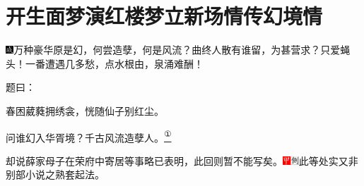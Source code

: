 

\chapter{开生面梦演红楼梦\hspace{.5em}立新场情传幻境情}
{\includegraphics[width=3mm]{../Images/00005}\kaishu 万种豪华原是幻，何尝造孽，何是风流？曲终人散有谁留，为甚营求？只爱蝇头！一番遭遇几多愁，点水根由，泉涌难酬！}

题曰：

春困葳蕤拥绣衾，恍随仙子别红尘。

问谁幻入华胥境？千古风流造孽人。\href{../Text/part0009_split_000.html\#lnkback_1_a}{\textsuperscript{①}}

却说薛家母子在荣府中寄居等事略已表明，此回则暂不能写矣。{\includegraphics[width=3mm]{../Images/00002}\includegraphics[width=3mm]{../Images/00011}\footnotesize \kaishu 此等处实又非别部小说之熟套起法。}

